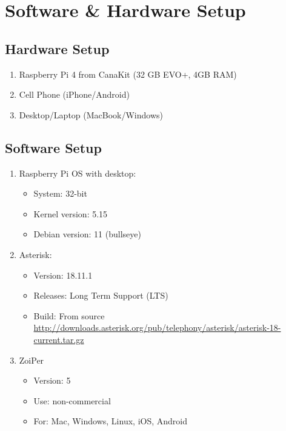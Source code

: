 \section{Software \& Hardware Setup}	\label{sec:setup}
	\subsection{Hardware Setup}	\label{subsec:hardware}
		\begin{enumerate}
			\item Raspberry Pi 4 from CanaKit (32 GB EVO+, 4GB RAM)
			\item Cell Phone (iPhone/Android)
			\item Desktop/Laptop (MacBook/Windows)
		\end{enumerate}
	\subsection{Software Setup}	\label{subsec:software}
		\begin{enumerate}
			\item Raspberry Pi OS with desktop: 
				\begin{itemize}
					\item System: 32-bit
					\item Kernel version: 5.15
					\item  Debian version: 11 (bullseye)
				\end{itemize}
			\item Asterisk:
				\begin{itemize}
					\item Version: 18.11.1
					\item Releases: Long Term Support (LTS)
					\item Build: From source \url{http://downloads.asterisk.org/pub/telephony/asterisk/asterisk-18-current.tar.gz}
				\end{itemize}
			\item ZoiPer
				\begin{itemize}
					\item Version: 5
					\item Use: non-commercial 
					\item For: Mac, Windows, Linux, iOS, Android
				\end{itemize}
		\end{enumerate}
	